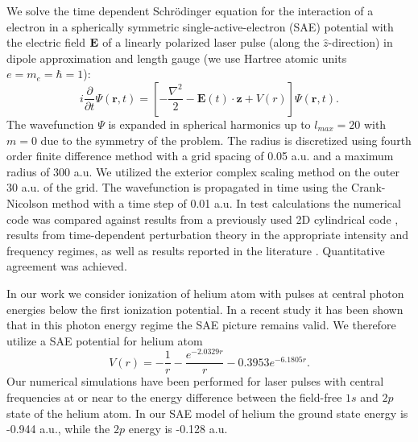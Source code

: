 We solve the time dependent Schr\"odinger equation for the interaction of a electron in a spherically symmetric single-active-electron (SAE) potential with the electric field ${\bf E}$ of a linearly polarized laser pulse (along the ${\hat z}$-direction) in dipole approximation and length gauge (we use Hartree atomic units $e = m_e = \hbar =1$): 
%
\begin{equation}
i\frac{\partial}{\partial t}\Psi(\mathbf{r},t) = \left[-\frac{\nabla^2}{2} - \mathbf{E}(t) \cdot \mathbf{z} + V(r)\right]\Psi(\mathbf{r},t).
\end{equation}
%
The wavefunction $\Psi$ is expanded in spherical harmonics up to $l_{max} = 20$ with $m=0$ due to the symmetry of the problem. The radius is discretized using fourth order finite difference method with a grid spacing of 0.05 a.u. and a maximum radius of 300 a.u. We utilized the exterior complex scaling method on the outer 30 a.u. of the grid. The wavefunction is propagated in time using the Crank-Nicolson method with a time step of 0.01 a.u. In test calculations the numerical code was compared against results from a previously used 2D cylindrical code \cite{venzke18ryd}, results from time-dependent perturbation theory in the appropriate intensity and frequency regimes, as well as results reported in the literature \cite{scrinzi10}. Quantitative agreement was achieved.

In our work we consider ionization of helium atom with pulses at central photon energies below the first ionization potential. In a recent study \cite{boll19} it has been shown that in this photon energy regime the SAE picture remains valid. We therefore utilize a SAE potential for helium atom 
%
\begin{equation}
V(r) = -\frac{1}{r} - \frac{e^{-2.0329r}}{r} - 0.3953 e^{-6.1805r}.
\end{equation}
%
Our numerical simulations have been performed for laser pulses with central frequencies at or near to the energy difference between the field-free $1s$ and $2p$ state of the helium atom. In our SAE model of helium the ground state energy is -0.944 a.u., while the $2p$ energy is -0.128 a.u.

